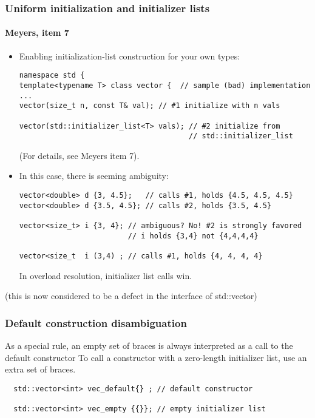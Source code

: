 \begin{frame}[fragile,t]
\frametitle{Uniform initialization and initializer lists}
\framesubtitle{Meyers, item 7}
\begin{itemize}[<+->]
\item Enabling initialization-list construction for your own types:
{\scriptsize\begin{verbatim}
namespace std {
template<typename T> class vector {  // sample (bad) implementation
...
vector(size_t n, const T& val); // #1 initialize with n vals

vector(std::initializer_list<T> vals); // #2 initialize from 
                                       // std::initializer_list
\end{verbatim}}
(For details, see Meyers item 7).
\item In this case, there is seeming ambiguity:
{\scriptsize\begin{verbatim}
vector<double> d {3, 4.5};   // calls #1, holds {4.5, 4.5, 4.5}
vector<double> d {3.5, 4.5}; // calls #2, holds {3.5, 4.5}

vector<size_t> i {3, 4}; // ambiguous? No! #2 is strongly favored
                         // i holds {3,4} not {4,4,4,4}

vector<size_t  i (3,4) ; // calls #1, holds {4, 4, 4, 4}
\end{verbatim}}
In overload resolution, initializer list calls win.  
\end{itemize}
\pause{}
(this is now considered to be a defect in the interface of std::vector)
\end{frame}


\begin{frame}[fragile,t]
\frametitle{Default construction disambiguation}
As a special rule, an empty set of braces is always interpreted as a
call to the default constructor
\vskip 6pt
\vskip 6pt
To call a constructor with a zero-length initializer list, use an
extra set of braces.
{\scriptsize\begin{verbatim}
  std::vector<int> vec_default{} ; // default constructor

  std::vector<int> vec_empty {{}}; // empty initializer list

\end{verbatim}}
\end{frame}



